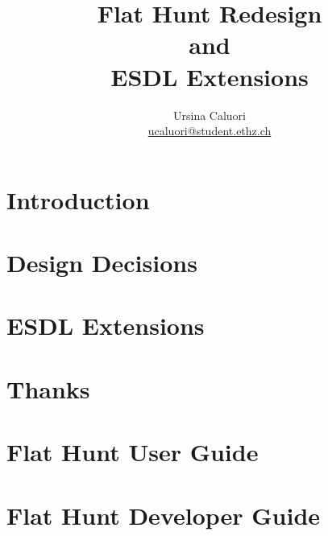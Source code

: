 \documentclass[a4paper,titlepage,12pt]{article}
\title{\textbf{Flat Hunt Redesign \\ and \\ ESDL Extensions}}
\author{Ursina Caluori\\ \href{mailto: ucaluori@student.ethz.ch}{ucaluori@student.ethz.ch}}
\begin{document}
  \maketitle

  \tableofcontents
  
  \pagebreak

  \section{Introduction}
    
  \section{Design Decisions}
    
  \section{ESDL Extensions}
    
  \section{Thanks}
        

  \hyperref[ref]{}
  
    
  \pagebreak
  
  \appendix
  \section{Flat Hunt User Guide}
  
  
  \pagebreak
  
  \section{Flat Hunt Developer Guide}
   
  
\end{document}
